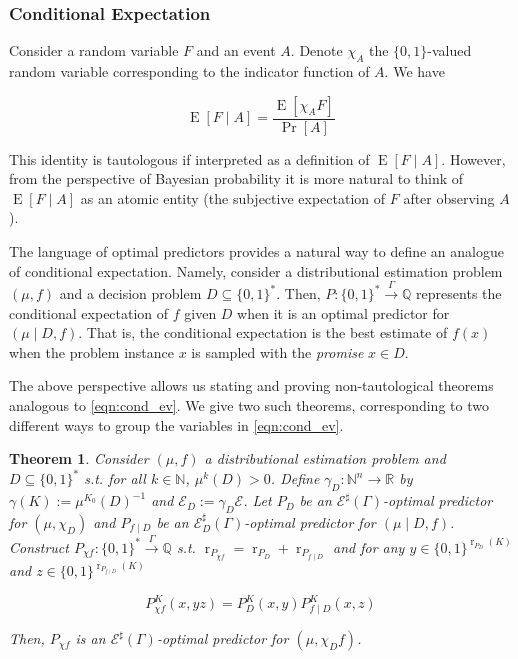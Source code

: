 \documentclass{article}
\numberwithin{equation}{section}
\theoremstyle{definition}
\theoremstyle{plain}
\newtheorem{theorem}{Theorem}[section]
\newcommand{\Bool}{\{0,1\}}
\newcommand{\Words}{{\Bool^*}}
\DeclareMathOperator{\Prb}{Pr}
\DeclareMathOperator{\E}{E}
\DeclareMathOperator{\R}{r}
\newcommand{\Nats}{\mathbb{N}}
\newcommand{\Rats}{\mathbb{Q}}
\newcommand{\Reals}{\mathbb{R}}
\newcommand{\Fall}{\mathcal{E}}
\newcommand{\ESG}{\Fall^\sharp(\Gamma)}
\newcommand{\BoolR}[1]{\Bool^{\R_{#1}(K)}}
\newcommand{\Scheme}{\xrightarrow{\Gamma}}
\begin{document}
\subsubsection{Conditional Expectation}

Consider a random variable $F$ and an event $A$. Denote $\chi_A$ the $\Bool$-valued random variable corresponding to the indicator function of $A$. We have

\begin{equation}
\label{eqn:cond_ev}
\E[F \mid A] = \frac{\E[\chi_A F]}{\Prb[A]}
\end{equation}

This identity is tautologous if interpreted as a definition of $\E[F \mid A]$. However, from the perspective of Bayesian probability it is more natural to think of $\E[F \mid A]$ as an atomic entity (the subjective expectation of $F$ after observing $A$). 

The language of optimal predictors provides a natural way to define an analogue of conditional expectation. Namely, consider a distributional estimation problem $(\mu, f)$ and a decision problem ${D \subseteq \Words}$. Then, $P: \Words \Scheme \Rats$ represents the conditional expectation of $f$ given $D$ when it is an optimal predictor for $(\mu \mid D, f)$. That is, the conditional expectation is the best estimate of $f(x)$ when the problem instance $x$ is sampled with the \emph{promise} $x \in D$.

The above perspective allows us stating and proving non-tautological theorems analogous to \ref{eqn:cond_ev}. We give two such theorems, corresponding to two different ways to group the variables in \ref{eqn:cond_ev}.

\begin{samepage}
\begin{theorem}

Consider $(\mu, f)$ a distributional estimation problem and ${D \subseteq \Words}$ s.t. for all $k \in \Nats$, $\mu^k(D) > 0$. Define $\gamma_D: \Nats^n \rightarrow \Reals$ by $\gamma(K):=\mu^{K_0}(D)^{-1}$ and $\Fall_D:=\gamma_D \Fall$. Let $P_D$ be an $\ESG$-optimal predictor for $(\mu, \chi_D)$ and $P_{f \mid D}$ be an $\Fall_D^\sharp(\Gamma)$-optimal predictor for ${(\mu \mid D, f)}$. Construct ${P_{\chi f}: \Words \Scheme \Rats}$ s.t. $\R_{P_{\chi f}}=\R_{P_D} + \R_{P_{f \mid D}}$ and for any $y \in \BoolR{P_D}$ and ${z \in \BoolR{P_{f \mid D}}}$

\begin{equation}
P_{\chi f}^K(x,yz)=P_D^K(x,y) P_{f \mid D}^K(x,z)
\end{equation}

Then, $P_{\chi f}$ is an $\ESG$-optimal predictor for $(\mu, \chi_Df)$.

\end{theorem}
\end{samepage}
\end{document}
